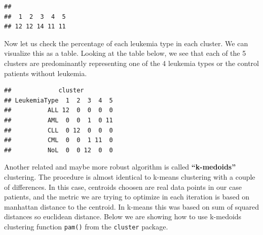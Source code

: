 \documentclass[12pt,]{krantz}
\newenvironment{Shaded}{\begin{snugshade}}{\end{snugshade}}
\newcommand{\CommentTok}[1]{\textcolor[rgb]{0.56,0.35,0.01}{\textit{#1}}}
\newcommand{\DataTypeTok}[1]{\textcolor[rgb]{0.13,0.29,0.53}{#1}}
\newcommand{\DecValTok}[1]{\textcolor[rgb]{0.00,0.00,0.81}{#1}}
\newcommand{\KeywordTok}[1]{\textcolor[rgb]{0.13,0.29,0.53}{\textbf{#1}}}
\newcommand{\NormalTok}[1]{#1}
\newcommand{\OperatorTok}[1]{\textcolor[rgb]{0.81,0.36,0.00}{\textbf{#1}}}
\newcommand{\StringTok}[1]{\textcolor[rgb]{0.31,0.60,0.02}{#1}}
\begin{document}
\begin{verbatim}
## 
##  1  2  3  4  5 
## 12 12 14 11 11
\end{verbatim}

Now let us check the percentage of each leukemia type in each cluster. We can visualize this as a table. Looking at the table below, we see that each of the 5 clusters are predominantly representing one of the 4 leukemia types or the control patients without leukemia.

\begin{Shaded}
\end{Shaded}

\begin{verbatim}
##             cluster
## LeukemiaType  1  2  3  4  5
##          ALL 12  0  0  0  0
##          AML  0  0  1  0 11
##          CLL  0 12  0  0  0
##          CML  0  0  1 11  0
##          NoL  0  0 12  0  0
\end{verbatim}

Another related and maybe more robust algorithm is called \textbf{``k-medoids''} clustering. The procedure is almost identical to k-means clustering with a couple of differences. In this case, centroids choosen are real data points in our case patients, and the metric we are trying to optimize in each iteration is based on manhattan distance to the centroid. In k-means this was based on sum of squared distances so euclidean distance. Below we are showing how to use k-medoids clustering function \texttt{pam()} from the \texttt{cluster} package.

\begin{Shaded}
\end{Shaded}
\end{document}
